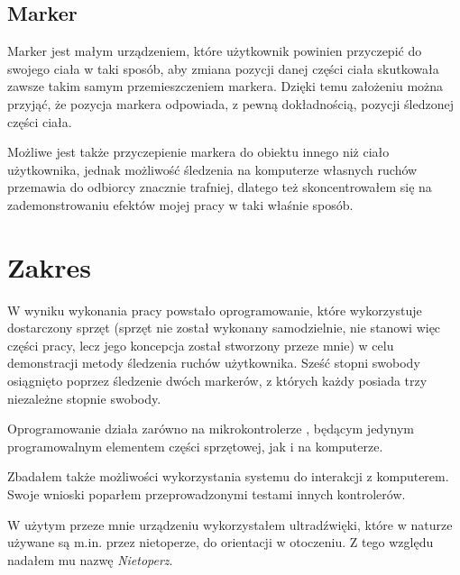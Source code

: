\subsection{Marker}
Marker jest małym urządzeniem, które użytkownik powinien przyczepić do swojego ciała w taki sposób, aby zmiana pozycji danej części ciała skutkowała zawsze takim samym przemieszczeniem markera. Dzięki temu założeniu można przyjąć, że pozycja markera odpowiada, z pewną dokładnością, pozycji śledzonej części ciała.

Możliwe jest także przyczepienie markera do obiektu innego niż ciało użytkownika, jednak możliwość śledzenia na komputerze własnych ruchów przemawia do odbiorcy znacznie trafniej, dlatego też skoncentrowałem się na zademonstrowaniu efektów mojej pracy w taki właśnie sposób.

\section{Zakres}
W wyniku wykonania pracy powstało oprogramowanie, które wykorzystuje dostarczony sprzęt (sprzęt nie został wykonany samodzielnie, nie stanowi więc części pracy, lecz jego koncepcja został stworzony przeze mnie) w celu demonstracji metody śledzenia ruchów użytkownika. Sześć stopni swobody osiągnięto poprzez śledzenie dwóch markerów, z których każdy posiada trzy niezależne stopnie swobody.

Oprogramowanie działa zarówno na mikrokontrolerze , będącym jedynym programowalnym elementem części sprzętowej, jak i na komputerze.

Zbadałem także możliwości wykorzystania systemu do interakcji z komputerem. Swoje wnioski poparłem przeprowadzonymi testami innych kontrolerów.

W użytym przeze mnie urządzeniu wykorzystałem ultradźwięki, które w naturze używane są m.in. przez nietoperze, do orientacji w otoczeniu. Z tego względu nadałem mu nazwę \textsl{Nietoperz}.

